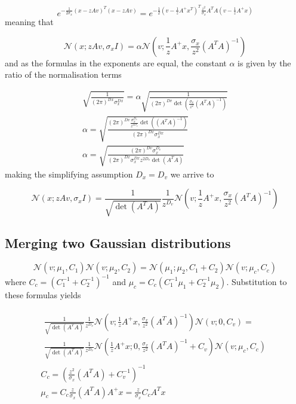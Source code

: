 \documentclass{paper}
\begin{document}
\begin{equation}
e^{-\frac{1}{2 \sigma_x} (x-zAv)^T(x-zAv)} = e^{-\frac{1}{2} (v - \frac{1}{z}A^{+}x^T)^T \frac{z^2}{\sigma_x} A^TA(v - \frac{1}{z}A^{+}x)}
\end{equation}
% 
meaning that

\begin{equation} 
\mathcal{N}(x;zAv,\sigma_x I) = \alpha \mathcal{N}(v;\frac{1}{z}A^{+}x,\frac{\sigma_x}{z^2} (A^TA)^{-1})
\end{equation}
%
and as the formulas in the exponents are equal, the constant  $\alpha$ is given by the ratio of the normalisation terms

\begin{eqnarray}
\sqrt{\frac{1}{(2\pi)^{Dx} \sigma_x^{Dx}}} = \alpha \sqrt{\frac{1}{(2\pi)^{Dv} \det(\frac{\sigma_x}{z^2} (A^TA)^{-1})}} \\
\alpha = \sqrt{\frac{ (2\pi)^{Dv} \frac{\sigma_x^{D_v}}{z^{2D_v}} \det( (A^TA)^{-1}) }{ (2\pi)^{Dx} \sigma_x^{Dx} }} \\
\alpha = \sqrt{\frac{ (2\pi)^{Dv} \sigma_x^{D_v} }{ (2\pi)^{Dx} \sigma_x^{Dx} z^{2D_v} \det(A^TA)}}
\end{eqnarray}
%
making the simplifying assumption $D_x = D_v$ we arrive to

\begin{equation} 
\mathcal{N}(x;zAv,\sigma_x I) = \frac{1}{\sqrt{\det(A^TA)}} \frac{1}{z^{D_v}} \mathcal{N}(v;\frac{1}{z}A^{+}x,\frac{\sigma_x}{z^2} (A^TA)^{-1})
\end{equation}

\subsection{Merging two Gaussian distributions} \label{sec:mergegauss}

\begin{equation} 
\mathcal{N}(v;\mu_1,C_1) \mathcal{N}(v;\mu_2,C_2) = \mathcal{N}(\mu_1;\mu_2,C_1 + C_2) \mathcal{N}(v; \mu_c,C_c)
\end{equation}
%
where $C_c = (C_1^{-1} + C_2^{-1})^{-1}$ and $\mu_c = C_c (C_1^{-1}\mu_1 + C_2^{-1}\mu_2)$. Substitution to these formulas yields

\begin{eqnarray}
\begin{split}
 \frac{1}{\sqrt{\det(A^TA)}} \frac{1}{z^{D_v}} \mathcal{N}(v;\frac{1}{z}A^{+}x,\frac{\sigma_x}{z^2} (A^TA)^{-1})\mathcal{N}(v;0,C_v) = \\
\frac{1}{\sqrt{\det(A^TA)}} \frac{1}{z^{D_v}} \mathcal{N}(\frac{1}{z}A^{+}x;0,\frac{\sigma_x}{z^2} (A^TA)^{-1} + C_v) \mathcal{N}(v; \mu_c,C_c)
 \end{split} \\
 C_c = (\frac{z^2}{\sigma_x} (A^TA) + C_v^{-1})^{-1} \\
 \mu_c = C_c \frac{z}{\sigma_x} (A^TA) A^{+}x = \frac{z}{\sigma_x} C_c A^{T}x
\end{eqnarray}
\end{document}
